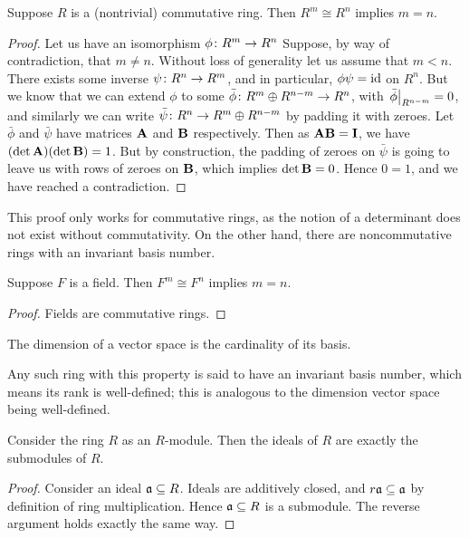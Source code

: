 \begin{theorem}
    Suppose \(R\) is a (nontrivial) commutative ring.
    Then \(R^m \cong R^n\) implies \(m = n\).
\end{theorem}
\begin{proof}
    Let us have an isomorphism \(\phi\colon R^m\to R^n\)
    Suppose, by way of contradiction, that \(m \neq n\).
    Without loss of generality let us assume that \(m < n\).
    There exists some inverse \(\psi\colon R^n\to R^m\),
    and in particular, \(\phi\psi = \operatorname{id}\) on \(R^n\).
    But we know that we can extend \(\phi\) to some \(\bar{\phi}\colon R^m \oplus R^{n-m}\to R^n\),
    with \(\eval{\bar{\phi}}_{R^{n-m}} = 0\),
    and similarly we can write \(\bar{\psi}\colon R^n\to R^m \oplus R^{n-m}\)
    by padding it with zeroes.
    Let \(\bar{\phi}\) and \(\bar{\psi}\) have matrices \(\vb{A}\) and \(\vb{B}\) respectively.
    Then as \(\vb{A}\vb{B} = \vb{I}\), we have \((\det\vb{A})(\det\vb{B}) = 1\).
    But by construction, the padding of zeroes on \(\bar{\psi}\)
    is going to leave us with rows of zeroes on \(\vb{B}\),
    which implies \(\det\vb{B} = 0\).
    Hence \(0 = 1\), and we have reached a contradiction.
\end{proof}
\begin{remark}
    This proof only works for commutative rings,
    as the notion of a determinant does not exist without commutativity.
    On the other hand, there are noncommutative rings with an invariant basis number.
\end{remark}
\begin{corollary}
    Suppose \(F\) is a field.
    Then \(F^m \cong F^n\) implies \(m = n\).
\end{corollary}
\begin{proof}
    Fields are commutative rings.
\end{proof}
\begin{definition}
    The dimension of a vector space is the cardinality of its basis.
\end{definition}
\begin{remark}
    Any such ring with this property is said to have an invariant basis number,
    which means its rank is well-defined;
    this is analogous to the dimension vector space being well-defined.
\end{remark}

\begin{proposition}\label{prop:ideal-submodule}
    Consider the ring \(R\) as an \(R\)-module.
    Then the ideals of \(R\) are exactly the submodules of \(R\).
\end{proposition}
\begin{proof}
    Consider an ideal \(\mathfrak{a} \subseteq R\).
    Ideals are additively closed, and \(r\mathfrak{a} \subseteq \mathfrak{a}\) by definition of ring multiplication.
    Hence \(\mathfrak{a} \subseteq R\) is a submodule.
    The reverse argument holds exactly the same way.
\end{proof}


